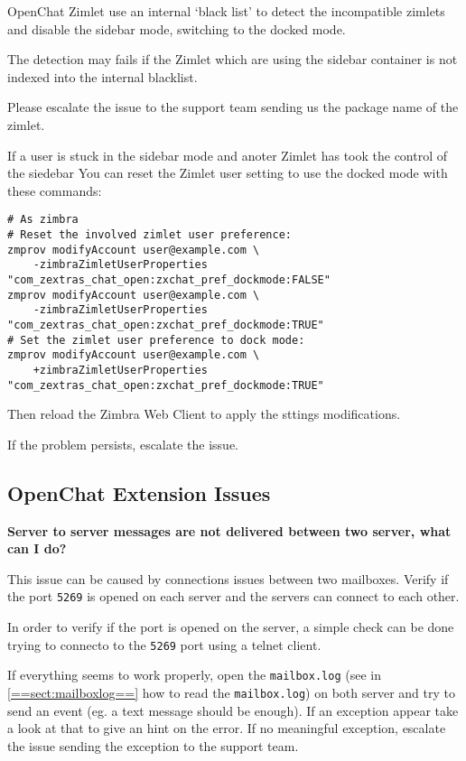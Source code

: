         OpenChat Zimlet use an internal `black list' to detect the incompatible zimlets and disable the sidebar mode, switching
        to the docked mode.

        The detection may fails if the Zimlet which are using the sidebar container is not indexed into the internal
        blacklist.

        Please escalate the issue to the support team sending us the package name of the zimlet.

        If a user is stuck in the sidebar mode and anoter Zimlet has took the control of the siedebar You can reset the
        Zimlet user setting to use the docked mode with these commands:
        \begin{verbatim}
# As zimbra
# Reset the involved zimlet user preference:
zmprov modifyAccount user@example.com \
    -zimbraZimletUserProperties "com_zextras_chat_open:zxchat_pref_dockmode:FALSE"
zmprov modifyAccount user@example.com \
    -zimbraZimletUserProperties "com_zextras_chat_open:zxchat_pref_dockmode:TRUE"
# Set the zimlet user preference to dock mode:
zmprov modifyAccount user@example.com \
    +zimbraZimletUserProperties "com_zextras_chat_open:zxchat_pref_dockmode:TRUE"
        \end{verbatim}

        Then reload the Zimbra Web Client to apply the sttings modifications.

        If the problem persists, escalate the issue.

    \subsection[Extension Issues]{OpenChat Extension Issues}

    \textbf{Server to server messages are not delivered between two server, what can I do?}

        This issue can be caused by connections issues between two mailboxes. Verify if the port \verb+5269+ is opened on
        each server and the servers can connect to each other.

        In order to verify if the port is opened on the server, a simple check can be done trying to connecto to the \verb+5269+
        port using a telnet client.

        If everything seems to work properly, open the \verb+mailbox.log+ (see in \ref{==sect:mailboxlog==} how to read
        the \verb+mailbox.log+) on both server and try to send an event (eg. a text message should be enough). If an
        exception appear take a look at that to give an hint on the error. If no meaningful exception, escalate the issue
        sending the exception to the support team.

